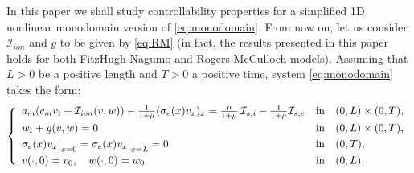 \documentclass[10pt]{article}
\def\dis{\displaystyle}
\def\\Phivec{\mathbf{\Phi}}
\begin{document}
    In this paper we shall study controllability properties for a simplified 1D nonlinear monodomain version
    of \eqref{eq:monodomain}. From now on, let us consider $\mathcal{I}_{ion}$ and $g$ to be given by \eqref{eq:RM}
    (in fact, the results presented in this paper holds for both FitzHugh-Nagumo and Rogers-McCulloch models).
    Assuming that $L>0$ be a positive length and $T>0$ a positive time,
    system \eqref{eq:monodomain} takes the form:
    \begin{equation}\label{eq:controlmonodomain}
    \left\{
        \begin{array}{lcl}
        a_m(c_mv_t+\mathcal{I}_{ion}(v,w))
        -{1\over1+\mu}(\sigma_e(x) v_x)_x
        ={\mu\over 1+\mu}\,\mathcal{I}_{s,i} -{1\over 1+\mu}\mathcal{I}_{s,e}
        &\mbox{in}&(0,L) \times (0,T),    \\
        \noalign{\smallskip}\dis
        w_t   +g(v,w)= 0
        &\mbox{in}&(0,L) \times (0,T),    \\
        \noalign{\smallskip}\dis
        \sigma_e(x)v_x\big|_{x=0}=\sigma_e(x)v_x\big|_{x=L} = 0
        &\mbox{in}&(0,T),            \\
        \noalign{\smallskip}\dis
        v(\cdot,0) =v_0,\quad w(\cdot,0) =w_0
        &\mbox{in}&(0,L).
        \end{array}
    \right.
\end{equation}
\end{document}
